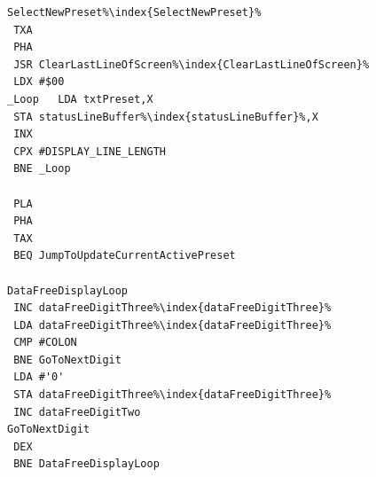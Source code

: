 \begin{minipage}[b]{0.33\linewidth}
\begin{lrbox}{\mybox}
\begin{lstlisting}[basicstyle=\ttfamily\tiny,escapechar=\%]
SelectNewPreset%\index{SelectNewPreset}%
 TXA
 PHA
 JSR ClearLastLineOfScreen%\index{ClearLastLineOfScreen}%
 LDX #$00
_Loop   LDA txtPreset,X
 STA statusLineBuffer%\index{statusLineBuffer}%,X
 INX
 CPX #DISPLAY_LINE_LENGTH
 BNE _Loop

 PLA
 PHA
 TAX
 BEQ JumpToUpdateCurrentActivePreset

DataFreeDisplayLoop
 INC dataFreeDigitThree%\index{dataFreeDigitThree}%
 LDA dataFreeDigitThree%\index{dataFreeDigitThree}%
 CMP #COLON
 BNE GoToNextDigit
 LDA #'0'
 STA dataFreeDigitThree%\index{dataFreeDigitThree}%
 INC dataFreeDigitTwo
GoToNextDigit
 DEX
 BNE DataFreeDisplayLoop

\end{lstlisting}
\end{lrbox}%
\scalebox{0.8}{\usebox{\mybox}}
\end{minipage}
